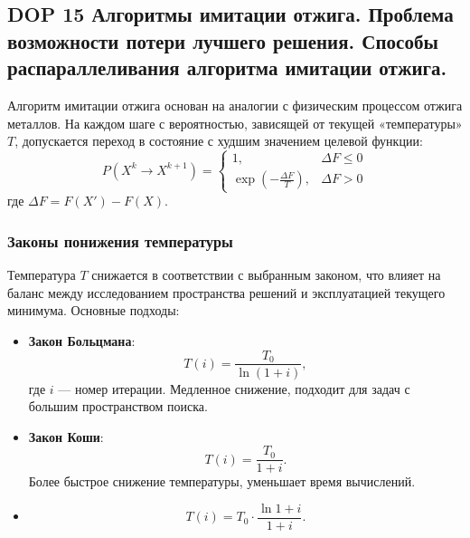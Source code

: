 \subsection{DOP 15 Алгоритмы имитации отжига.
Проблема возможности потери лучшего решения.
Способы распараллеливания алгоритма имитации отжига.}

Алгоритм имитации отжига основан на аналогии с физическим процессом отжига металлов. На каждом шаге с вероятностью, зависящей от текущей «температуры» $T$, допускается переход в состояние с худшим значением целевой функции:
\[
P(X^k \to X^{k+1}) =
\begin{cases}
1, & \Delta F \leq 0 \\
\exp\left(-\frac{\Delta F}{T}\right), & \Delta F > 0
\end{cases}
\]
где $\Delta F = F(X') - F(X)$.

\subsubsection*{Законы понижения температуры}
Температура $T$ снижается в соответствии с выбранным законом, что влияет на баланс между исследованием пространства решений и эксплуатацией текущего минимума. Основные подходы:
\begin{itemize}
    \item \textbf{Закон Больцмана}:
    \[
    T(i) = \frac{T_0}{\ln(1+i)},
    \]
    где $i$ — номер итерации. Медленное снижение, подходит для задач с большим пространством поиска.

    \item \textbf{Закон Коши}:
    \[
    T(i) = \frac{T_0}{1+i}.
    \]
    Более быстрое снижение температуры, уменьшает время вычислений.

    \item
	\[
		T(i) = T_0\cdot\frac{\ln{1+i}}{1+i}.
    \]

    \end{itemize}

